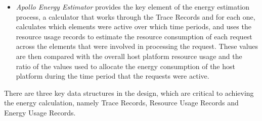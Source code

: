 \begin{itemize}
\item \emph{Apollo Energy Estimator} provides the key element of the energy estimation process, a calculator that works through the Trace Records and for each one, calculates which elements were active over which time periods, and uses the resource usage records to estimate the resource consumption of each request across the elements that were involved in processing the request.  These values are then compared with the overall host platform resource usage and the ratio of the values used to allocate the energy consumption of the host platform during the time period that the requests were active.

\end{itemize}

There are three key data structures in the design, which are critical to achieving the energy calculation, namely Trace Records, Resource Usage Records and Energy Usage Records.

